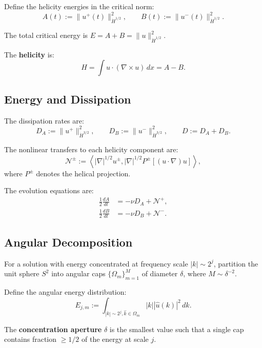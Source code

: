 \documentclass[11pt]{article}
\theoremstyle{definition}
\newcommand{\cN}{\mathcal{N}}
\newcommand{\inner}[2]{\left\langle #1, #2 \right\rangle}
\begin{document}
Define the helicity energies in the critical norm:
\begin{equation}
A(t) := \|u^+(t)\|_{\dot{H}^{1/2}}^2, \qquad B(t) := \|u^-(t)\|_{\dot{H}^{1/2}}^2.
\end{equation}

The total critical energy is $E = A + B = \|u\|_{\dot{H}^{1/2}}^2$.

The \textbf{helicity} is:
\begin{equation}
H = \int u \cdot (\nabla \times u) \, dx = A - B.
\end{equation}

\subsection{Energy and Dissipation}

The dissipation rates are:
\begin{equation}
D_A := \|u^+\|_{\dot{H}^{3/2}}^2, \qquad D_B := \|u^-\|_{\dot{H}^{3/2}}^2, \qquad D := D_A + D_B.
\end{equation}

The nonlinear transfers to each helicity component are:
\begin{equation}
\cN^\pm := \inner{|\nabla|^{1/2} u^\pm}{|\nabla|^{1/2} P^\pm[(u \cdot \nabla)u]},
\end{equation}
where $P^\pm$ denotes the helical projection.

The evolution equations are:
\begin{align}
\frac{1}{2}\frac{dA}{dt} &= -\nu D_A + \cN^+, \\
\frac{1}{2}\frac{dB}{dt} &= -\nu D_B + \cN^-.
\end{align}

\subsection{Angular Decomposition}

For a solution with energy concentrated at frequency scale $|k| \sim 2^j$, partition the unit sphere $S^2$ into angular caps $\{\Omega_m\}_{m=1}^M$ of diameter $\delta$, where $M \sim \delta^{-2}$.

Define the angular energy distribution:
\begin{equation}
E_{j,m} := \int_{|k| \sim 2^j, \hat{k} \in \Omega_m} |k| |\hat{u}(k)|^2 \, dk.
\end{equation}

The \textbf{concentration aperture} $\delta$ is the smallest value such that a single cap contains fraction $\geq 1/2$ of the energy at scale $j$.
\end{document}
